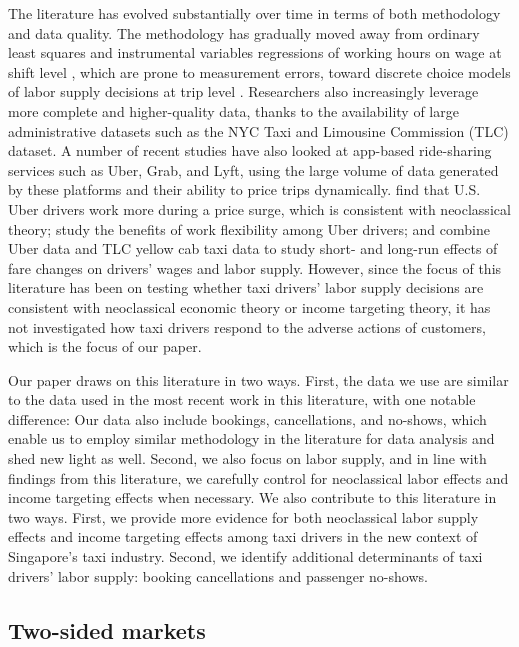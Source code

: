 \documentclass[reviewmode]{AEA}
\begin{document}
The literature has evolved substantially over time  in terms of both methodology and data quality. The methodology has gradually moved away from ordinary least squares and instrumental variables regressions of working hours on wage  at shift level \citep{camerer1997labor}, which are prone to measurement errors, toward discrete choice models of labor supply decisions at trip level \citep{farber2005tomorrow,farber2015you,crawford2011new,martin2017quit}. Researchers also increasingly leverage more complete and higher-quality data, thanks to the availability of large administrative datasets such as the NYC Taxi and Limousine Commission (TLC) dataset. A number of recent studies have also looked at app-based ride-sharing services such as Uber, Grab, and Lyft, using the large volume of data generated by these platforms and their ability to price trips dynamically. \citet{chen2015dynamic} find that U.S. Uber drivers work more during a price surge, which is consistent with neoclassical theory; \citet{chen2017value} study the benefits of work flexibility among Uber drivers; and \citet{hall2017labor} combine Uber data and TLC yellow cab taxi data to study short- and long-run effects of fare changes on drivers' wages and labor supply. However, since the focus of this literature has been on testing whether taxi drivers' labor supply decisions are consistent with neoclassical economic theory or income targeting theory, it has not investigated how taxi drivers respond to the adverse actions of customers, which is the focus of our paper.

Our paper draws on this literature in two ways. First, the data we use are similar to the data used in the most recent work in this literature, with one notable difference: Our data also include bookings, cancellations, and no-shows, which enable us to employ similar methodology in the literature for data analysis and shed new light as well. Second, we also focus on labor supply, and in line with findings from this literature, we carefully control for neoclassical labor effects and income targeting effects when necessary. We also contribute to this literature in two ways. First, we provide more evidence for both neoclassical labor supply effects and income targeting effects among taxi drivers in the new context of Singapore's taxi industry. Second, we identify  additional determinants of taxi drivers' labor supply: booking cancellations and passenger no-shows.

\subsection{Two-sided markets}
\end{document}

